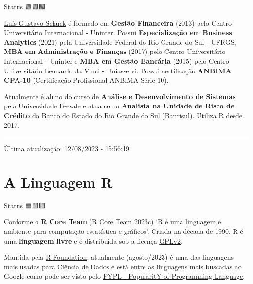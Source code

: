 \documentclass[
  letterpaper,
  DIV=11,
  numbers=noendperiod]{scrreprt}
\begin{document}

\protect\hyperlink{status-do-material}{Status} 🟩🟩🟩

\href{http://lattes.cnpq.br/0794590310791580}{Luís Gustavo Schuck} é
formado em \textbf{Gestão Financeira} (2013) pelo Centro Universitário
Internacional - Uninter. Possui \textbf{Especialização em Business
Analytics} (2021) pela Universidade Federal do Rio Grande do Sul -
UFRGS, \textbf{MBA} \textbf{em Administração e Finanças} (2017) pelo
Centro Universitário Internacional - Uninter e \textbf{MBA em Gestão
Bancária} (2015) pelo Centro Universitário Leonardo da Vinci -
Uniasselvi. Possui certificação \textbf{ANBIMA CPA-10} (Certificação
Profissional ANBIMA Série-10).

Atualmente é aluno do curso de \textbf{Análise e Desenvolvimento de
Sistemas} pela Universidade Feevale e atua como \textbf{Analista na
Unidade de Risco de Crédito} do Banco do Estado do Rio Grande do Sul
(\href{https://ri.banrisul.com.br/quem-somos/}{Banrisul}). Utiliza R
desde 2017.

\begin{center}\rule{0.5\linewidth}{0.5pt}\end{center}

Última atualização: 12/08/2023 - 15:56:19

\part{A Linguagem R}

\protect\hyperlink{status-do-material}{Status} 🟦🟨🟨

Conforme o \textbf{R Core Team} (R Core Team 2023c) `R é uma linguagem e
ambiente para computação estatística e gráficos'. Criada na década de
1990, R é uma \textbf{linguagem livre} e é distribuída sob a licença
\href{https://www.r-project.org/COPYING}{GPLv2}.

Mantida pela \href{https://www.r-project.org/foundation/}{R Foundation},
atualmente (agosto/2023) é uma das linguagens mais usadas para Ciência
de Dados e está entre as linguagens mais buscadas no Google como pode
ser visto pelo \href{https://pypl.github.io/PYPL.html}{PYPL - PopularitY
of Programming Language}.
\end{document}
